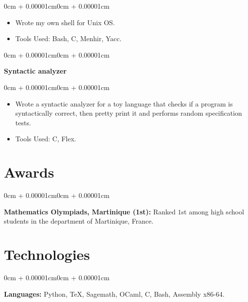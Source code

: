 \documentclass[10pt, letterpaper]{article}
\newenvironment{highlights}{
    \begin{itemize}[
        topsep=0.10cm,
        parsep=0.10cm,
        partopsep=0pt,
        itemsep=0pt,
        leftmargin=0cm + 10pt
    ]
}{
    \end{itemize}
}
\newenvironment{onecolentry}{
    \begin{adjustwidth}{0cm + 0.00001cm}{0cm + 0.00001cm}
}{
    \end{adjustwidth}
}
\begin{document}
\vspace{0.10cm}
\begin{onecolentry}
    \begin{highlights}
        \item Wrote my own shell for Unix OS.
        \item Tools Used: Bash, C, Menhir, Yacc.
    \end{highlights}
\end{onecolentry}

\vspace{0.2cm}

\begin{onecolentry}
    \textbf{Syntactic analyzer}
\end{onecolentry}

\vspace{0.10cm}
\begin{onecolentry}
    \begin{highlights}
        \item Wrote a syntactic analyzer for a toy language that checks if a program is syntactically correct, then pretty print it and performs random specification tests.
        \item Tools Used: C, Flex.
    \end{highlights}
\end{onecolentry}

\vspace{0.2cm}

\section{Awards}

\begin{onecolentry}
    \textbf{Mathematics Olympiads, Martinique (1st):} Ranked $1$st among high school students in the department of Martinique, France.
\end{onecolentry}

\section{Technologies}

\begin{onecolentry}
    \textbf{Languages:} Python, \TeX, Sagemath, OCaml, C, Bash, Assembly x86-64.
\end{onecolentry}
\end{document}
